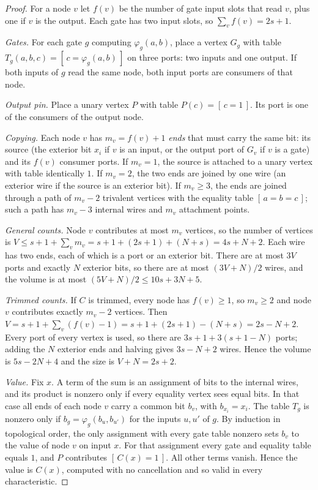 \documentclass[11pt]{article}
\theoremstyle{definition}
\begin{document}
\begin{proof}
For a node $v$ let $f(v)$ be the number of gate input slots that read $v$, plus one if $v$ is the output. Each gate has two input slots, so $\sum_v f(v) = 2s+1$.

\emph{Gates.} For each gate $g$ computing $\varphi_g(a,b)$, place a vertex $G_g$ with table $T_g(a,b,c) = [\,c=\varphi_g(a,b)\,]$ on three ports: two inputs and one output. If both inputs of $g$ read the same node, both input ports are consumers of that node.

\emph{Output pin.} Place a unary vertex $P$ with table $P(c)=[\,c=1\,]$. Its port is one of the consumers of the output node.

\emph{Copying.} Each node $v$ has $m_v = f(v)+1$ \emph{ends} that must carry the same bit: its source (the exterior bit $x_i$ if $v$ is an input, or the output port of $G_v$ if $v$ is a gate) and its $f(v)$ consumer ports. If $m_v=1$, the source is attached to a unary vertex with table identically $1$. If $m_v=2$, the two ends are joined by one wire (an exterior wire if the source is an exterior bit). If $m_v\ge3$, the ends are joined through a path of $m_v-2$ trivalent vertices with the equality table $[\,a=b=c\,]$; such a path has $m_v-3$ internal wires and $m_v$ attachment points.

\emph{General counts.} Node $v$ contributes at most $m_v$ vertices, so the number of vertices is $V\le s+1+\sum_v m_v = s+1+(2s+1)+(N+s) = 4s+N+2$. Each wire has two ends, each of which is a port or an exterior bit. There are at most $3V$ ports and exactly $N$ exterior bits, so there are at most $(3V+N)/2$ wires, and the volume is at most $(5V+N)/2 \le 10s+3N+5$.

\emph{Trimmed counts.} If $C$ is trimmed, every node has $f(v)\ge1$, so $m_v\ge 2$ and node $v$ contributes exactly $m_v-2$ vertices. Then $V = s+1+\sum_v (f(v)-1) = s+1+(2s+1)-(N+s) = 2s-N+2$. Every port of every vertex is used, so there are $3s+1+3(s+1-N)$ ports; adding the $N$ exterior ends and halving gives $3s-N+2$ wires. Hence the volume is $5s-2N+4$ and the size is $V+N=2s+2$.

\emph{Value.} Fix $x$. A term of the sum is an assignment of bits to the internal wires, and its product is nonzero only if every equality vertex sees equal bits. In that case all ends of each node $v$ carry a common bit $b_v$, with $b_{x_i}=x_i$. The table $T_g$ is nonzero only if $b_g=\varphi_g(b_u,b_{u'})$ for the inputs $u,u'$ of $g$. By induction in topological order, the only assignment with every gate table nonzero sets $b_v$ to the value of node $v$ on input $x$. For that assignment every gate and equality table equals $1$, and $P$ contributes $[\,C(x)=1\,]$. All other terms vanish. Hence the value is $C(x)$, computed with no cancellation and so valid in every characteristic.
\end{proof}
\end{document}
